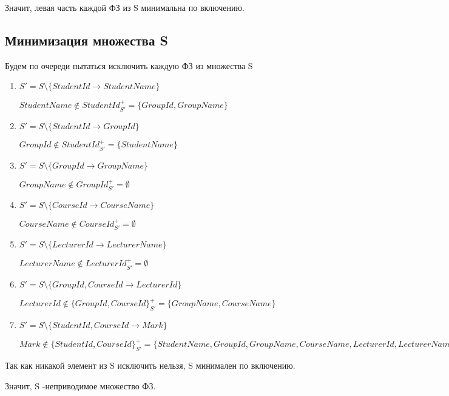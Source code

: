 \documentclass{article}
\begin{document}
	Значит, левая часть каждой ФЗ из S минимальна по включению.

	\subsection{Минимизация множества S}
	
	Будем по очереди пытаться исключить каждую ФЗ из множества S
	
	\begin{enumerate}
		\item 
		$S' = S \setminus \{StudentId \rightarrow StudentName\}$
		
		$StudentName \not\in StudentId^+_{S'} = \{GroupId, GroupName\}$
		
		\item 
		$S' = S \setminus \{StudentId \rightarrow GroupId\}$
		
		$GroupId \not\in StudentId^+_{S'} = \{StudentName\}$
		
		\item 
		$S' = S \setminus \{GroupId \rightarrow GroupName\}$
		
		$GroupName \not\in GroupId^+_{S'} = \emptyset$
		
		\item 
		$S' = S \setminus \{CourseId \rightarrow CourseName\}$
		
		$CourseName \not\in CourseId^+_{S'} = \emptyset$
		
		\item 
		$S' = S \setminus \{LecturerId \rightarrow LecturerName\}$
		
		$LecturerName \not\in LecturerId ^+_{S'} = \emptyset$
		
		\item 
		$S' = S \setminus \{GroupId, CourseId \rightarrow LecturerId\}$
		
		$LecturerId \not\in \{GroupId, CourseId\}^+_{S'} = \{GroupName, CourseName\}$
		
		\item 
		$S' = S \setminus \{StudentId, CourseId \rightarrow Mark\}$
		
		$Mark \not\in \{StudentId, CourseId\}^+_{S'} = \{StudentName, GroupId, GroupName, CourseName, LecturerId, LecturerName\}$
	\end{enumerate}

	Так как никакой элемент из S исключить нельзя, S минимален по включению.
	
	Значит, S -неприводимое множество ФЗ.
\end{document}
